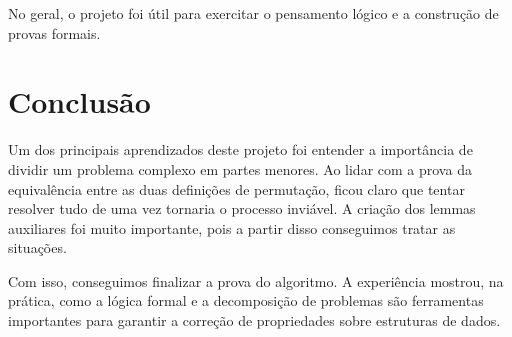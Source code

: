 \documentclass[twocolumn]{article}
\begin{document}
No geral, o projeto foi útil para exercitar o pensamento lógico e a construção de provas formais.

\section{Conclusão}
Um dos principais aprendizados deste projeto foi entender a importância de dividir um problema complexo em partes menores. Ao lidar com a prova da equivalência entre as duas definições de permutação, ficou claro que tentar resolver tudo de uma vez tornaria o processo inviável. A criação dos lemmas auxiliares foi muito importante, pois a partir disso conseguimos tratar as situações.

Com isso, conseguimos finalizar a prova do algoritmo. A experiência mostrou, na prática, como a lógica formal e a decomposição de problemas são ferramentas importantes para garantir a correção de propriedades sobre estruturas de dados.


%
%
\end{document}
